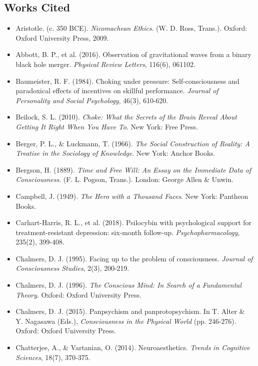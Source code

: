 \subsection*{Works Cited}


\begin{itemize}[nosep,leftmargin=*]
  \item Aristotle. (c. 350 BCE). \textit{Nicomachean Ethics}. (W. D. Ross, Trans.). Oxford: Oxford University Press, 2009.
  \item Abbott, B. P., et al. (2016). Observation of gravitational waves from a binary black hole merger. \textit{Physical Review Letters}, 116(6), 061102.
  \item Baumeister, R. F. (1984). Choking under pressure: Self-consciousness and paradoxical effects of incentives on skillful performance. \textit{Journal of Personality and Social Psychology}, 46(3), 610-620.
  \item Beilock, S. L. (2010). \textit{Choke: What the Secrets of the Brain Reveal About Getting It Right When You Have To}. New York: Free Press.
  \item Berger, P. L., \& Luckmann, T. (1966). \textit{The Social Construction of Reality: A Treatise in the Sociology of Knowledge}. New York: Anchor Books.
  \item Bergson, H. (1889). \textit{Time and Free Will: An Essay on the Immediate Data of Consciousness}. (F. L. Pogson, Trans.). London: George Allen \& Unwin.
  \item Campbell, J. (1949). \textit{The Hero with a Thousand Faces}. New York: Pantheon Books.
  \item Carhart-Harris, R. L., et al. (2018). Psilocybin with psychological support for treatment-resistant depression: six-month follow-up. \textit{Psychopharmacology}, 235(2), 399-408.
  \item Chalmers, D. J. (1995). Facing up to the problem of consciousness. \textit{Journal of Consciousness Studies}, 2(3), 200-219.
  \item Chalmers, D. J. (1996). \textit{The Conscious Mind: In Search of a Fundamental Theory}. Oxford: Oxford University Press.
  \item Chalmers, D. J. (2015). Panpsychism and panprotopsychism. In T. Alter \& Y. Nagasawa (Eds.), \textit{Consciousness in the Physical World} (pp. 246-276). Oxford: Oxford University Press.
  \item Chatterjee, A., \& Vartanian, O. (2014). Neuroaesthetics. \textit{Trends in Cognitive Sciences}, 18(7), 370-375.

\end{itemize}
